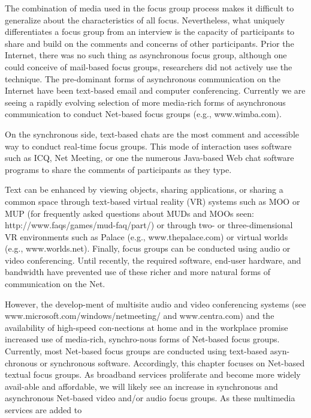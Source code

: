 \documentclass[a4,9pt]{beamer}
\begin{document}
\begin{frame}
\hspace*{0.5cm} The combination of media used in the focus group process makes it difficult to generalize about the characteristics of all focus. Nevertheless, what uniquely differentiates a focus group from an interview is the capacity of participants to share and build on the comments and concerns of other participants. Prior the Internet, there was no such thing as asynchronous focus group, although one could conceive of mail-based focus groups, researchers did not actively use the technique. The pre-dominant forms of asynchronous communication on the Internet have been text-based email and computer conferencing. Currently we are seeing a rapidly evolving selection of more media-rich forms of asynchronous communication to conduct Net-based focus groups (e.g., www.wimba.com). 
\end{frame}

\begin{frame}
On the synchronous side, text-based chats are the most comment and accessible way to conduct real-time focus groups. This mode of interaction uses software such as ICQ, Net Meeting, or one the numerous Java-based Web chat software programs to share the comments of participants as they type.

Text can be enhanced by viewing objects, sharing applications, or sharing a common space through text-based virtual reality (VR) systems such as MOO or MUP (for frequently asked questions about MUDs and MOOs seen: http://www.faqs/games/mud-faq/part/) or through two- or three-dimensional VR environments such as Palace (e.g., www.thepalace.com) or virtual worlds (e.g., www.worlds.net). Finally, focus groups can be conducted using audio or video conferencing. Until recently, the required software, end-user hardware, and bandwidth have prevented use of these richer and more natural forms of communication on the Net. 
\end{frame}

\begin{frame}
However, the develop-ment of multisite audio and video conferencing systems (see www.microsoft.com/windows/netmeeting/ and www.centra.com) and the availability of high-speed con-nections at home and in the workplace promise increased use of media-rich, synchro-nous forms of Net-based focus groups.\\
\hspace*{0.5cm} Currently, most Net-based focus groups are conducted using text-based asyn-chronous or synchronous software. Accordingly, this chapter focuses on Net-based textual focus groups. As broadband services proliferate and become more widely avail-able and affordable, we will likely see an increase in synchronous and asynchronous Net-based video and/or audio focus groups. As these multimedia services are added to\\
\end{frame}
\end{document}
